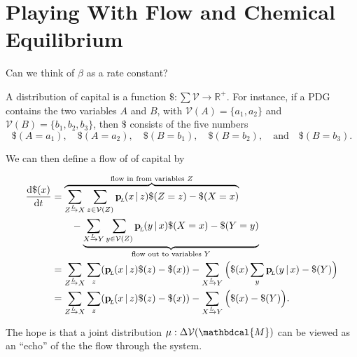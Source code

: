 \documentclass[twoside]{article} %
\theoremstyle{plain}
\theoremstyle{definition}
\newcommand{\mat}[1]{\mathbf{#1}}
\newcommand{\ssub}[1]{_{\!_{#1}\!}}
\newcommand{\bp}[1][L]{\mat{p}\ssub{#1}}
\newcommand{\V}{\mathcal V}
\newcommand{\dg}[1]{\mathbdcal{#1}}
\newcommand{\ed}[3]{#2%
    	  \overset{\smash{\mskip-5mu\raisebox{-1pt}{$\scriptscriptstyle
    	        #1$}}}{\rightarrow} #3}
\begin{document}
\clearpage
    \section*{Playing With Flow and Chemical Equilibrium}
    Can we think of $\beta$ as a rate constant?

    \begin{defn}
        A distribution of capital is a function $\$ : \sum \V \to \mathbb R^+$.
        For instance, if a PDG contains the two variables $A$ and $B$, with $\V(A) = \{a_1, a_2\}$ and $\V(B) = \{b_1, b_2, b_3\}$, then $\$$ consists of the five numbers
        \[
            \$(A\!=\!a_1),\quad
            \$(A\!=\!a_2),\quad
            \$(B\!=\!b_1),\quad
            \$(B\!=\!b_2),\quad\text{and}\quad
            \$(B\!=\!b_3).
        \]
    \end{defn}


    We can then define a flow of of capital by

    \begin{align*}
        \frac{\mathrm d \$(x) }{\mathrm dt} &=
            \overbrace{%
                \sum_{\ed LZX} \sum_{z \in \V(Z)} \bp(x\,|\,z) \$(Z=z)-\$(X=x)
            }^{\text{flow in from variables $Z$}} \\
            &\qquad -
                \underbrace{%
                \sum_{\ed LXY} \sum_{y \in \V(Z)} \bp(y\,|\,x) \$(X=x)-\$(Y=y)
                }_{\text{flow out to variables $Y$}}
            \\
            &= \sum_{\ed LZX} \sum_z (\bp(x\,|\,z) \$(z)-\$(x))
                -\sum_{\ed LXY} \Big(\$(x)\sum_{y} \bp(y\,|\,x) - \$(Y) \Big) \\
            &= \sum_{\ed LZX} \sum_z (\bp(x\,|\,z) \$(z)-\$(x))
                -\sum_{\ed LXY} \Big(\$(x) - \$(Y) \Big)
            .
    \end{align*}


    The hope is that a joint distribution $\mu : \Delta \V(\dg M)$ can be viewed as an ``echo'' of the the flow through the system.


    \begin{example}

    \end{example}
\end{document}
